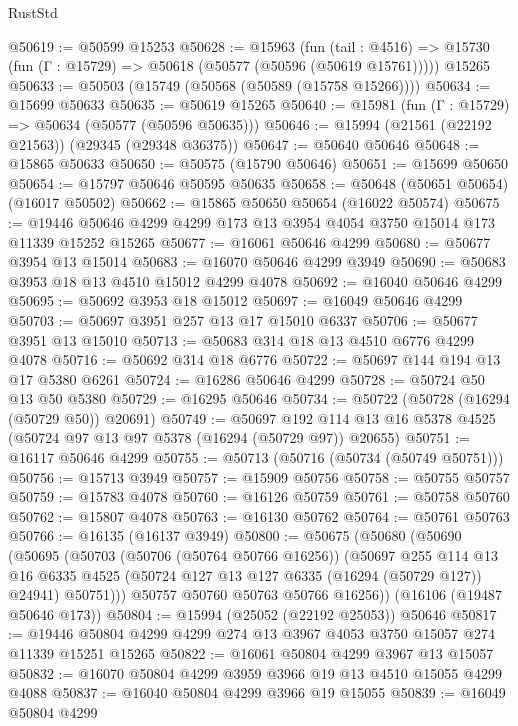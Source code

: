 \begin{lexlean}{RustStd}
\begin{coremodule}
@50619 := @50599 @15253
@50628 := @15963
    (fun (tail : @4516) => @15730 (fun (Γ : @15729) => @50618 (@50577 (@50596 (@50619 @15761)))))
    @15265
@50633 := @50503 (@15749 (@50568 (@50589 (@15758 @15266))))
@50634 := @15699 @50633
@50635 := @50619 @15265
@50640 := @15981 (fun (Γ : @15729) => @50634 (@50577 (@50596 @50635)))
@50646 := @15994 (@21561 (@22192 @21563)) (@29345 (@29348 @36375))
@50647 := @50640 @50646
@50648 := @15865 @50633
@50650 := @50575 (@15790 @50646)
@50651 := @15699 @50650
@50654 := @15797 @50646 @50595 @50635
@50658 := @50648 (@50651 @50654) (@16017 @50502)
@50662 := @15865 @50650 @50654 (@16022 @50574)
@50675 := @19446 @50646 @4299 @4299 @173 @13 @3954 @4054 @3750 @15014 @173 @11339 @15252 @15265
@50677 := @16061 @50646 @4299
@50680 := @50677 @3954 @13 @15014
@50683 := @16070 @50646 @4299 @3949
@50690 := @50683 @3953 @18 @13 @4510 @15012 @4299 @4078
@50692 := @16040 @50646 @4299
@50695 := @50692 @3953 @18 @15012
@50697 := @16049 @50646 @4299
@50703 := @50697 @3951 @257 @13 @17 @15010 @6337
@50706 := @50677 @3951 @13 @15010
@50713 := @50683 @314 @18 @13 @4510 @6776 @4299 @4078
@50716 := @50692 @314 @18 @6776
@50722 := @50697 @144 @194 @13 @17 @5380 @6261
@50724 := @16286 @50646 @4299
@50728 := @50724 @50 @13 @50 @5380
@50729 := @16295 @50646
@50734 := @50722 (@50728 (@16294 (@50729 @50)) @20691)
@50749 := @50697
    @192
    @114
    @13
    @16
    @5378
    @4525
    (@50724 @97 @13 @97 @5378 (@16294 (@50729 @97)) @20655)
@50751 := @16117 @50646 @4299
@50755 := @50713 (@50716 (@50734 (@50749 @50751)))
@50756 := @15713 @3949
@50757 := @15909 @50756
@50758 := @50755 @50757
@50759 := @15783 @4078
@50760 := @16126 @50759
@50761 := @50758 @50760
@50762 := @15807 @4078
@50763 := @16130 @50762
@50764 := @50761 @50763
@50766 := @16135 (@16137 @3949)
@50800 := @50675
    (@50680
      (@50690
        (@50695
          (@50703
            (@50706 (@50764 @50766 @16256))
            (@50697
              @255
              @114
              @13
              @16
              @6335
              @4525
              (@50724 @127 @13 @127 @6335 (@16294 (@50729 @127)) @24941)
              @50751)))
        @50757
        @50760
        @50763
        @50766
        @16256))
    (@16106 (@19487 @50646 @173))
@50804 := @15994 (@25052 (@22192 @25053)) @50646
@50817 := @19446 @50804 @4299 @4299 @274 @13 @3967 @4053 @3750 @15057 @274 @11339 @15251 @15265
@50822 := @16061 @50804 @4299 @3967 @13 @15057
@50832 := @16070 @50804 @4299 @3959 @3966 @19 @13 @4510 @15055 @4299 @4088
@50837 := @16040 @50804 @4299 @3966 @19 @15055
@50839 := @16049 @50804 @4299

\end{coremodule}
\end{lexlean}
